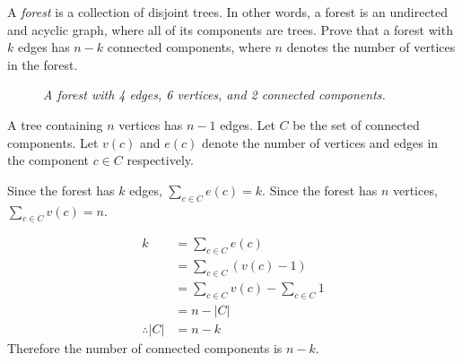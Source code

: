 \documentclass{article}
\begin{document}
\begin{question}
A {\em forest} is a collection of disjoint trees. In other words, a forest is an undirected and acyclic graph, where all of its components are trees. Prove that a forest with $k$ edges has $n - k$ connected components, where $n$ denotes the number of vertices in the forest.

\begin{figure}[H]
    \centering
    \caption{{\em A forest with 4 edges, 6 vertices, and 2 connected components.}}
\end{figure}
\end{question}

\begin{solution}
    A tree containing $n$ vertices has $n-1$ edges. Let $C$ be the set of connected components. 
    Let $v(c)$ and $e(c)$ denote the number of vertices and edges in the component $c\in C$ respectively.

    Since the forest has $k$ edges, $\displaystyle\sum_{c\in C}e(c)=k$. Since the forest has $n$ vertices, $\displaystyle\sum_{c\in C}v(c)=n$.

    \begin{align*}
        k&=\sum_{c\in C} e(c)\\
        &=\sum_{c\in C} (v(c) - 1)\\
        &=\sum_{c\in C} v(c) - \sum_{c\in C} 1\\
        &= n-|C|\\
        \therefore |C|&=n-k
    \end{align*}
    Therefore the number of connected components is $n-k$.
\end{solution}
\end{document}
